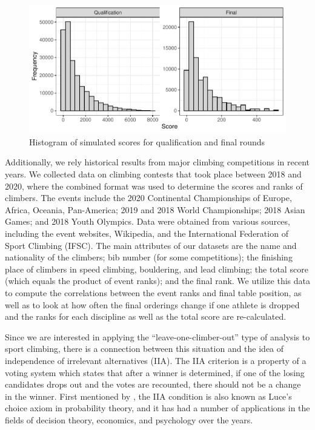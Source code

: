 \documentclass[12pt]{article}
\begin{document}
\begin{figure}

{\centering \includegraphics{draft_files/figure-latex/unnamed-chunk-5-1} 

}

\caption{Histogram of simulated scores for qualification and final rounds}\label{fig:unnamed-chunk-5}
\end{figure}

Additionally, we rely historical results from major climbing
competitions in recent years. We collected data on climbing contests
that took place between 2018 and 2020, where the combined format was
used to determine the scores and ranks of climbers. The events include
the 2020 Continental Championships of Europe, Africa, Oceania,
Pan-America; 2019 and 2018 World Championships; 2018 Asian Games; and
2018 Youth Olympics. Data were obtained from various sources, including
the event websites, Wikipedia, and the International Federation of Sport
Climbing (IFSC). The main attributes of our datasets are the name and
nationality of the climbers; bib number (for some competitions); the
finishing place of climbers in speed climbing, bouldering, and lead
climbing; the total score (which equals the product of event ranks); and
the final rank. We utilize this data to compute the correlations between
the event ranks and final table position, as well as to look at how
often the final orderings change if one athlete is dropped and the ranks
for each discipline as well as the total score are re-calculated.

Since we are interested in applying the ``leave-one-climber-out'' type
of analysis to sport climbing, there is a connection between this
situation and the idea of independence of irrelevant alternatives (IIA).
The IIA criterion is a property of a voting system which states that
after a winner is determined, if one of the losing candidates drops out
and the votes are recounted, there should not be a change in the winner.
First mentioned by \citet{arrow1951}, the IIA condition is also known as
Luce's choice axiom \citep{luce1959} in probability theory, and it has
had a number of applications in the fields of decision theory,
economics, and psychology over the years.
\end{document}
